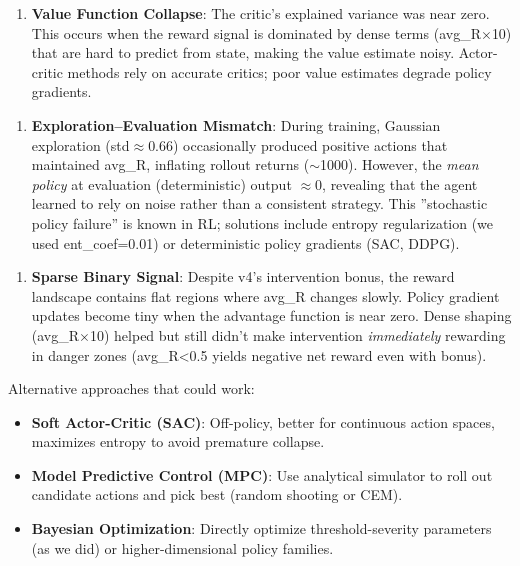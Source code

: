 \documentclass[11pt]{article}
\begin{document}
\begin{enumerate}
\item \textbf{Value Function Collapse}: The critic's explained variance was near zero. This occurs when the reward signal is dominated by dense terms (avg\_R$\times$10) that are hard to predict from state, making the value estimate noisy. Actor-critic methods rely on accurate critics; poor value estimates degrade policy gradients.
\end{enumerate}

\begin{enumerate}
\item \textbf{Exploration--Evaluation Mismatch}: During training, Gaussian exploration (std$\approx$0.66) occasionally produced positive actions that maintained avg\_R, inflating rollout returns ($\sim$1000). However, the \textit{mean policy} at evaluation (deterministic) output $\approx$0, revealing that the agent learned to rely on noise rather than a consistent strategy. This ''stochastic policy failure'' is known in RL; solutions include entropy regularization (we used ent\_coef=0.01) or deterministic policy gradients (SAC, DDPG).
\end{enumerate}

\begin{enumerate}
\item \textbf{Sparse Binary Signal}: Despite v4's intervention bonus, the reward landscape contains flat regions where avg\_R changes slowly. Policy gradient updates become tiny when the advantage function is near zero. Dense shaping (avg\_R$\times$10) helped but still didn't make intervention \textit{immediately} rewarding in danger zones (avg\_R<0.5 yields negative net reward even with bonus).
\end{enumerate}

Alternative approaches that could work:

\begin{itemize}
\item \textbf{Soft Actor-Critic (SAC)}: Off-policy, better for continuous action spaces, maximizes entropy to avoid premature collapse.
\item \textbf{Model Predictive Control (MPC)}: Use analytical simulator to roll out candidate actions and pick best (random shooting or CEM).
\item \textbf{Bayesian Optimization}: Directly optimize threshold-severity parameters (as we did) or higher-dimensional policy families.
\end{itemize}
\end{document}
